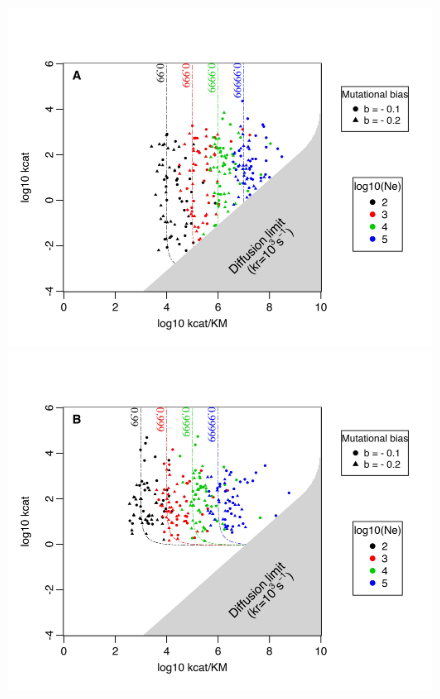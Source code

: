 \documentclass[nogrid,crop,final]{MBE2}%
\begin{document}
\begin{figure}[h!]
\centering
\begin{minipage}[c]{0.5\linewidth}
\includegraphics[scale=0.65,trim=0.25cm 0cm 0.5cm 1.5cm,clip]{Figures/2DFitLandscape_Evo_Results_lowF_withbias_Def.jpeg} 
\end{minipage} \hspace{0.5cm}\hfill
\begin{minipage}[c]{0.46\linewidth}
\includegraphics[scale=0.65,trim=0cm 0cm 3.5cm 1.5cm,clip]{Figures/2DFitLandscape_Evo_Results_highF_withbias_Def.jpeg} 

\end{minipage}
\end{figure}
\end{document}
